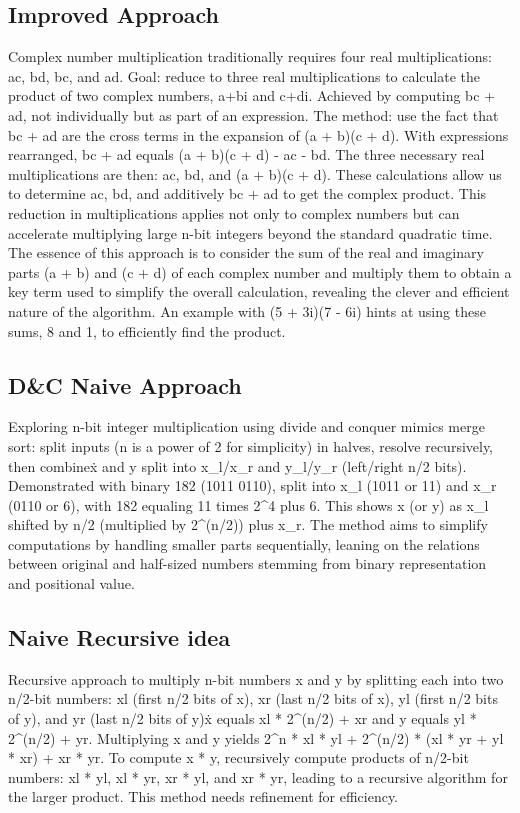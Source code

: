 \subsection*{Improved Approach}
Complex number multiplication traditionally requires four real multiplications: ac, bd, bc, and ad.
Goal: reduce to three real multiplications to calculate the product of two complex numbers, a+bi and c+di.
Achieved by computing bc + ad, not individually but as part of an expression.
The method: use the fact that bc + ad are the cross terms in the expansion of (a + b)(c + d).
With expressions rearranged, bc + ad equals (a + b)(c + d) - ac - bd.
The three necessary real multiplications are then: ac, bd, and (a + b)(c + d).
These calculations allow us to determine ac, bd, and additively bc + ad to get the complex product.
This reduction in multiplications applies not only to complex numbers but can accelerate multiplying large n-bit integers beyond the standard quadratic time.
The essence of this approach is to consider the sum of the real and imaginary parts (a + b) and (c + d) of each complex number and multiply them to obtain a key term used to simplify the overall calculation, revealing the clever and efficient nature of the algorithm.
An example with (5 + 3i)(7 - 6i) hints at using these sums, 8 and 1, to efficiently find the product.

\subsection*{D\&C  Naive Approach}
Exploring n-bit integer multiplication using divide and conquer mimics merge sort: split inputs (n is a power of 2 for simplicity) in halves, resolve recursively, then combine\. x and y split into x\_l/x\_r and y\_l/y\_r (left/right n/2 bits).
Demonstrated with binary 182 (1011 0110), split into x\_l (1011 or 11) and x\_r (0110 or 6), with 182 equaling 11 times 2\textasciicircum{}4 plus 6.
This shows x (or y) as x\_l shifted by n/2 (multiplied by 2\textasciicircum{}(n/2)) plus x\_r.
The method aims to simplify computations by handling smaller parts sequentially, leaning on the relations between original and half-sized numbers stemming from binary representation and positional value.

\subsection*{Naive  Recursive idea}
Recursive approach to multiply n-bit numbers x and y by splitting each into two n/2-bit numbers: xl (first n/2 bits of x), xr (last n/2 bits of x), yl (first n/2 bits of y), and yr (last n/2 bits of y)\. x equals xl * 2\textasciicircum{}(n/2) + xr and y equals yl * 2\textasciicircum{}(n/2) + yr.
Multiplying x and y yields 2\textasciicircum{}n * xl * yl + 2\textasciicircum{}(n/2) * (xl * yr + yl * xr) + xr * yr.
To compute x * y, recursively compute products of n/2-bit numbers: xl * yl, xl * yr, xr * yl, and xr * yr, leading to a recursive algorithm for the larger product.
This method needs refinement for efficiency.

